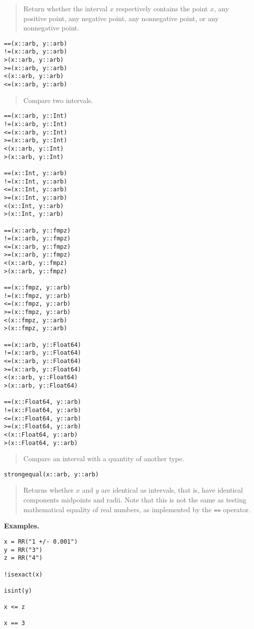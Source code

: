 \documentclass[a4paper,10pt]{article}
\newcommand{\code}{\lstinline}
\newcommand{\desc}[1]{\vspace{-3mm}\begin{quote}#1\end{quote}}
\begin{document}
{{\desc{Return whether the interval $x$ respectively contains the
point $x$, any positive point, any negative point, any nonnegative point,
or any nonnegative point.}

\begin{lstlisting}
==(x::arb, y::arb)
!=(x::arb, y::arb)
>(x::arb, y::arb)
>=(x::arb, y::arb)
<(x::arb, y::arb)
<=(x::arb, y::arb)
\end{lstlisting}

\desc{Compare two intervals.}

\begin{lstlisting}
==(x::arb, y::Int)
!=(x::arb, y::Int)
<=(x::arb, y::Int)
>=(x::arb, y::Int)
<(x::arb, y::Int)
>(x::arb, y::Int)

==(x::Int, y::arb)
!=(x::Int, y::arb)
<=(x::Int, y::arb)
>=(x::Int, y::arb)
<(x::Int, y::arb)
>(x::Int, y::arb)

==(x::arb, y::fmpz)
!=(x::arb, y::fmpz)
<=(x::arb, y::fmpz)
>=(x::arb, y::fmpz)
<(x::arb, y::fmpz)
>(x::arb, y::fmpz)

==(x::fmpz, y::arb)
!=(x::fmpz, y::arb)
<=(x::fmpz, y::arb)
>=(x::fmpz, y::arb)
<(x::fmpz, y::arb)
>(x::fmpz, y::arb)

==(x::arb, y::Float64)
!=(x::arb, y::Float64)
<=(x::arb, y::Float64)
>=(x::arb, y::Float64)
<(x::arb, y::Float64)
>(x::arb, y::Float64)

==(x::Float64, y::arb)
!=(x::Float64, y::arb)
<=(x::Float64, y::arb)
>=(x::Float64, y::arb)
<(x::Float64, y::arb)
>(x::Float64, y::arb)
\end{lstlisting}

\desc{Compare an interval with a quantity of another type.}

\begin{lstlisting}
strongequal(x::arb, y::arb)
\end{lstlisting}

\desc{Returns whether $x$ and $y$ are identical as intervals, that is,
have identical components midpoints and radii. Note that this is
not the same as testing mathematical equality of real numbers,
as implemented by the \code{==} operator.}

\textbf{Examples.}

\begin{lstlisting}
x = RR("1 +/- 0.001")
y = RR("3")
z = RR("4")

!isexact(x)

isint(y)

x <= z

x == 3


\end{lstlisting}}}
\end{document}
